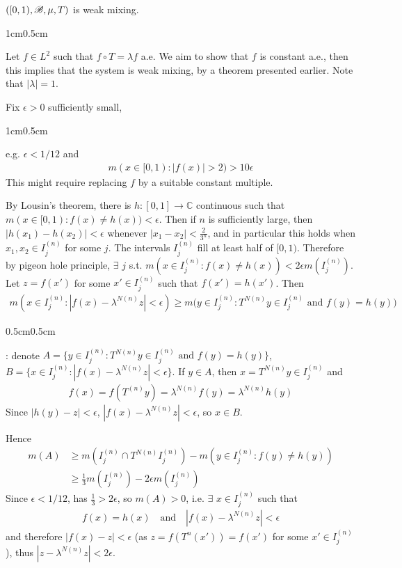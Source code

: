 \documentclass[12pt,a4paper]{report}
\newenvironment{proof}
{\begin{changemargin}{1cm}{0.5cm} 
	}%
	{\end{changemargin}
}
\newenvironment{subproof}
{\begin{changemargin}{0.5cm}{0.5cm}
	}%
	{\end{changemargin}
}
\begin{document}
\thm  $([0,1), \mathscr{B}, \mu, T)$ is weak mixing.
\begin{proof}
\pf Let $f\in L^2$ such that $f\circ T = \lambda f$ a.e. We aim to show that $f$ is constant a.e., then this implies that the system is weak mixing, by a theorem presented earlier. Note that $|\lambda| =1$.

\quad Fix $\epsilon >0$ sufficiently small,
\begin{proof}
e.g. $\epsilon < 1/12$ and
\begin{align*}
m(x\in [0,1) : |f(x)| >2) > 10\epsilon
\end{align*}
This might require replacing $f$ by a suitable constant multiple. 
\end{proof}
By Lousin's theorem, there is $h :[0,1] \rightarrow \mathbb{C}$ continuous such that $m(x\in [0,1) : f(x) \neq h(x)) < \epsilon$. Then if $n$ is sufficiently large, then $|h(x_1)-h(x_2)| < \epsilon$ whenever $|x_1 - x_2| < \frac{2}{3^n}$, and in particular this holds  when $x_1,x_2 \in I_j^{(n)}$ for some $j$. The intervals $I^{(n)}_j$ fill at least half of $[0,1)$. Therefore by pigeon hole principle, $\exists$ $j$ s.t. $m(x\in I^{(n)}_j : f(x) \neq h(x)) < 2\epsilon m(I^{(n)}_j)$. Let $z = f(x')$ for some $x' \in I^{(n)}_j$ such that $f(x') = h(x')$. Then
\begin{align*}
m(x\in I^{(n)}_j : |f(x) - \lambda^{N(n)}z| < \epsilon) \geq m\big( y \in I^{(n)}_j : T^{N(n)} y \in I^{(n)}_j \text{ and } f(y) = h(y) \big) 
\end{align*}
\begin{subproof}
: denote $A = \{ y \in I^{(n)}_j : T^{N(n)} y \in I^{(n)}_j \text{ and } f(y) = h(y) \}$, $B = \{ x\in I^{(n)}_j : |f(x) - \lambda^{N(n)}z| < \epsilon\}$. If $y\in A$, then $x = T^{N(n)} y \in I^{(n)}_j$ and 
\begin{align*}
f(x) = f(T^{(n)} y) = \lambda^{N(n)} f(y) = \lambda^{N(n)} h(y)
\end{align*}
Since $|h(y)-z| < \epsilon$, $|f(x) - \lambda^{N(n)}z| < \epsilon$, so $x\in B$. 
\end{subproof}
Hence
\begin{align*}
m(A) & \geq m(I_j^{(n)} \cap T^{N(n)}I^{(n)}_j)  - m(y \in I^{(n)}_j : f(y) \neq h(y)) \\
& \geq \frac{1}{3} m(I^{(n)}_j) - 2\epsilon m(I^{(n)}_j)
\end{align*}
Since $\epsilon < 1/12$, has $\frac{1}{3} > 2\epsilon$, so $m(A) >0$, i.e. $\exists$ $x\in I^{(n)}_j$ such that
\begin{align*}
f(x)  = h(x) \quad \text{and} \quad |f(x) - \lambda^{N(n)} z| < \epsilon
\end{align*}
and therefore $|f(x)-z| < \epsilon$ (as $z = f(T^n( x')) = f(x')$ for some $x' \in I^{(n)}_j$), thus $|z-\lambda^{N(n)}z| < 2\epsilon$.


\end{proof}
\end{document}
